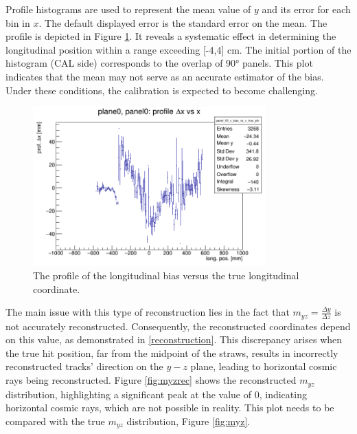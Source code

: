 Profile histograms are used to represent the mean value of $y$ and its error for each bin in $x$. 
The default displayed error is the standard error on the mean. 
The profile is depicted in Figure \ref{fig:profile}. It reveals a systematic effect in determining the 
longitudinal position within a range exceeding [-4,4] cm. The initial portion of the histogram (CAL side) 
corresponds to the overlap of 90° panels. This plot indicates that the mean may not serve as an accurate estimator of the bias. 
Under these conditions, the calibration is expected to become challenging.
\begin{figure}[!h]
    \centering
    \includegraphics[width=0.8\textwidth]{figures/png/panel_00_x_bias_vs_x_prof.png}
    \caption{The profile of the longitudinal bias versus the true longitudinal coordinate.}
    \label{fig:profile}
\end{figure}
The main issue with this type of reconstruction lies in the fact that $m_{yz}=\frac{\Delta y}{\Delta z}$ 
is not accurately reconstructed. Consequently, the reconstructed coordinates depend on this value, as demonstrated in \ref{reconstruction}. 
This discrepancy arises when the true hit position, far from the midpoint of the straws, results in incorrectly reconstructed tracks'
direction on the $y-z$ plane, leading to horizontal cosmic rays being reconstructed. 
Figure \ref{fig:myzrec} shows the reconstructed $m_{yz}$ distribution, highlighting a significant peak at the value of 0, 
indicating horizontal cosmic rays, which are not possible in reality. This plot needs to be compared with the true $m_{yz}$ distribution, Figure \ref{fig:myz}.


